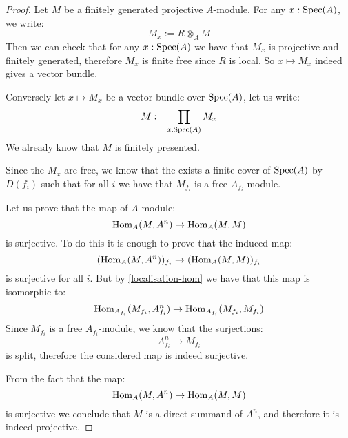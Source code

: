 \begin{proof}
Let $M$ be a finitely generated projective $A$-module. For any $x:\operatorname{Spec}(A)$, we write:
\[M_x := R\otimes_AM\]
Then we can check that for any $x:\operatorname{Spec}(A)$ we have that $M_x$ is projective and finitely generated, therefore $M_x$ is finite free since $R$ is local. So $x\mapsto M_x$ indeed gives a vector bundle.

Conversely let $x\mapsto M_x$ be a vector bundle over $\operatorname{Spec}(A)$, let us write:
\[M:= \prod_{x:\operatorname{Spec}(A)} M_x\]
We already know that $M$ is finitely presented. 

Since the $M_x$ are free, we know that the exists a finite cover of $\operatorname{Spec}(A)$ by $D(f_i)$ such that for all $i$ we have that $M_{f_i}$ is a free $A_{f_i}$-module.

Let us prove that the map of $A$-module:
\[\mathrm{Hom}_A(M,A^n) \to \mathrm{Hom}_A(M,M)\]
is surjective. To do this it is enough to prove that the induced map:
\[(\mathrm{Hom}_A(M,A^n))_{f_i} \to (\mathrm{Hom}_A(M,M))_{f_i}\]
is surjective for all $i$. But by \cref{localisation-hom} we have that this map is isomorphic to:
\[\mathrm{Hom}_{A_{f_i}}(M_{f_i},A_{f_i}^n) \to \mathrm{Hom}_{A_{f_i}}(M_{f_i},M_{f_i})\]
Since $M_{f_i}$ is a free $A_{f_i}$-module, we know that the surjections:
\[A_{f_i}^n \to M_{f_i}\]
is split, therefore the considered map is indeed surjective.

From the fact that the map:
\[\mathrm{Hom}_A(M,A^n) \to \mathrm{Hom}_A(M,M)\]
is surjective we conclude that $M$ is a direct summand of $A^n$, and therefore it is indeed projective.
\end{proof}